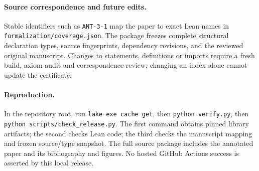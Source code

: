 \paragraph{Source correspondence and future edits.} Stable identifiers such as \texttt{ANT-3-1} map the paper to exact Lean names in \texttt{formalization/coverage.json}. The package freezes complete structural declaration types, source fingerprints, dependency revisions, and the reviewed original manuscript. Changes to statements, definitions or imports require a fresh build, axiom audit and correspondence review; changing an index alone cannot update the certificate.

\paragraph{Reproduction.} In the repository root, run \texttt{lake exe cache get}, then \texttt{python verify.py}, then \texttt{python scripts/check\_release.py}. The first command obtains pinned library artifacts; the second checks Lean code; the third checks the manuscript mapping and frozen source/type snapshot. The full source package includes the annotated paper and its bibliography and figures. No hosted GitHub Actions success is asserted by this local release.
